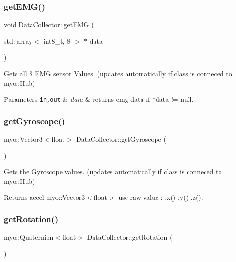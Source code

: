 \subsubsection{\texorpdfstring{get\+E\+M\+G()}{getEMG()}}
{\footnotesize\ttfamily void Data\+Collector\+::get\+E\+MG (\begin{DoxyParamCaption}\item[{std\+::array$<$ int8\+\_\+t, 8 $>$ $\ast$}]{data }\end{DoxyParamCaption})\hspace{0.3cm}{\ttfamily [inline]}}



Gets all 8 E\+MG sensor Values. (updates automatically if class is conneced to myo\+::\+Hub) 


\begin{DoxyParams}[1]{Parameters}
\mbox{\tt in,out}  & {\em data} & returns emg data if $\ast$data != null. \\
\hline
\end{DoxyParams}
\mbox{\label{class_data_collector_a04ad19d96b8574ff7c9f945cd1c5ddc6}} 
\subsubsection{\texorpdfstring{get\+Gyroscope()}{getGyroscope()}}
{\footnotesize\ttfamily myo\+::\+Vector3$<$float$>$ Data\+Collector\+::get\+Gyroscope (\begin{DoxyParamCaption}{ }\end{DoxyParamCaption})\hspace{0.3cm}{\ttfamily [inline]}}



Gets the Gyroscope values. (updates automatically if class is conneced to myo\+::\+Hub) 

\begin{DoxyReturn}{Returns}
accel myo\+::\+Vector3$<$float$>$ use raw value \+: .x() .y() .z(). 
\end{DoxyReturn}
\mbox{\label{class_data_collector_a46a7e8adb8679fde1021fe89ed0d0be0}} 
\subsubsection{\texorpdfstring{get\+Rotation()}{getRotation()}}
{\footnotesize\ttfamily myo\+::\+Quaternion$<$float$>$ Data\+Collector\+::get\+Rotation (\begin{DoxyParamCaption}{ }\end{DoxyParamCaption})\hspace{0.3cm}{\ttfamily [inline]}}




